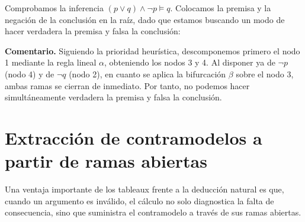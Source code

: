 \begin{ejemplo}
Comprobamos la inferencia $(p \lor q) \land \neg p \models q$.
Colocamos la premisa y la negación de la conclusión en la raíz, dado
que estamos buscando un modo de hacer verdadera la premisa y falsa la
conclusión:
\begin{center}
\end{center}
\textbf{Comentario.} Siguiendo la prioridad heurística, descomponemos
primero el nodo 1 mediante la regla lineal $\alpha$, obteniendo los
nodos 3 y 4. Al disponer ya de $\neg p$ (nodo 4) y de $\neg q$ (nodo
2), en cuanto se aplica la bifurcación $\beta$ sobre el nodo 3, ambas
ramas se cierran de inmediato. Por tanto, no podemos hacer simultáneamente verdadera
la premisa y falsa la conclusión. 
\end{ejemplo}


\section{Extracción de contramodelos a partir de ramas abiertas}

Una ventaja importante de los tableaux frente a la deducción natural es que, cuando un argumento es inválido, el cálculo no solo diagnostica la falta de consecuencia, sino que suministra el contramodelo a través de sus ramas abiertas.

